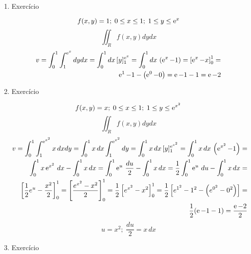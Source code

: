 \begin{enumerate}
	\item Exercício
	
	\begin{equation*}
		f(x,y) = 1;\; 0 \leq x \leq 1;\; 1 \leq y \leq \operatorname{e}^x	
	\end{equation*}
	\begin{equation*}
		\iint_R f(x, y) dy dx
	\end{equation*}
	\begin{align*}
		v = \int_0^1 \int_1^{\operatorname{e}^x} dy dx = \int_0^1 dx\, [y]_1^{\operatorname{e}^x} = \int_0^1 dx\, \left(\operatorname{e}^x - 1\right) = \left[\operatorname{e}^x - x\right]_0^1 =\\ \operatorname{e}^1 - 1 - \left(\operatorname{e}^0 - 0\right) = \operatorname{e} - 1 - 1 = \operatorname{e} - 2	
	\end{align*}
	
	\item Exercício
	
	\begin{equation*}
		f(x,y) = x;\; 0 \leq x \leq 1;\; 1 \leq y \leq \operatorname{e}^{x^2}
	\end{equation*}
	\begin{equation*}
		\iint_R f(x, y) dy dx
	\end{equation*}
	\begin{align*}
		v = \int_0^1 \int_1^{\operatorname{e}^{x^2}} x\, dx dy = \int_0^1 x\,	dx \int_1^{\operatorname{e}^{x^2}} dy = \int_0^1 x\, dx\, [y]_1^{\operatorname{e}^{x^2}} = \int_0^1 x\, dx\, \left(\operatorname{e}^{x^2} - 1\right) =\\ \int_0^1 x\operatorname{e}^{x^2}\, dx - \int_0^1 x\,	dx = \int_0^1 \operatorname{e}^u\, \dfrac{du}{2} - \int_0^1 x\,	dx = \dfrac{1}{2}\int_0^1 \operatorname{e}^u\, du - \int_0^1 x\, dx =\\ \left[\dfrac{1}{2}e^u - \dfrac{x^2}{2}\right]_0^1 = \left[\dfrac{e^{x^2} - x^2}{2}\right]_0^1 = \dfrac{1}{2} \left[e^{x^2} - x^2\right]_0^1 = \dfrac{1}{2} \left[e^{1^2} - 1^2 - \left(e^{0^2} - 0^2\right)\right] =\\ \dfrac{1}{2}(\operatorname{e} - 1 - 1) = \dfrac{\operatorname{e} - 2}{2}
	\end{align*}	
	\begin{equation*}
		u = x^2 ;\; \dfrac{du}{2} = x\, dx
	\end{equation*}
	
	\item Exercício
	

\end{enumerate}
